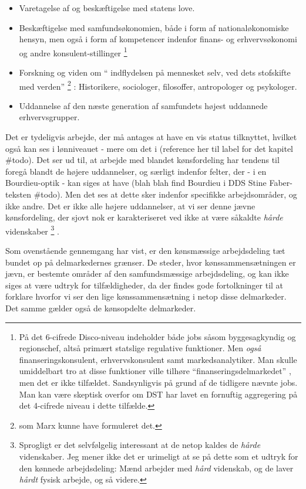 %
\begin{itemize}
 \itemsep -0.5em
   \item Varetagelse af og beskæftigelse med statens love.
   \item Beskæftigelse med samfundsøkonomien, både i form af nationaløkonomiske hensyn, men også i form af kompetencer indenfor finans- og erhvervsøkonomi og andre konsulent-stillinger%
   \footnote{ På det 6-cifrede Disco-niveau indeholder  både jobs såsom byggesagkyndig og regionschef, altså primært statslige regulative funktioner. Men \emph{også} finanseringskonsulent, erhvervskonsulent samt markedsanalytiker. Man skulle umiddelbart tro at disse funktioner ville tilhøre “finanseringsdelmarkedet” , men det er ikke tilfældet. Sandsynligvis på grund af de tidligere nævnte jobs. Man kan være skeptisk overfor om DST har lavet en fornuftig aggregering på det 4-cifrede niveau i dette tilfælde.}%
   \item Forskning og viden om “ indflydelsen på mennesket selv, ved dets stofskifte med verden”%
   \footnote{ som Marx kunne have formuleret det.}%
    : Historikere, sociologer, filosoffer, antropologer og psykologer.    
   \item Uddannelse af den næste generation af samfundets højest uddannede erhvervsgrupper. 
\end{itemize}
%

Det er tydeligvis arbejde, der må antages at have en vis status tilknyttet, hvilket også kan ses i lønniveauet - mere om det i (reference her til label for det kapitel \#todo).  Det ser ud til, at arbejde med blandet kønsfordeling har tendens til foregå blandt de højere uddannelser, og særligt indenfor felter, der - i en Bourdieu-optik - kan siges at have (blah blah find Bourdieu i DDS Stine Faber-teksten \#todo). Men det ses at dette sker indenfor specifikke arbejdsområder, og ikke andre. Det er ikke alle højere uddannelser, at vi ser denne jævne kønsfordeling, der sjovt nok er karakteriseret ved ikke at være såkaldte \emph{hårde} videnskaber%
%
\footnote{ Sprogligt er det selvfølgelig interessant at de netop kaldes de \emph{hårde} videnskaber. Jeg mener ikke det er urimeligt at se på dette som et udtryk for den kønnede arbejdsdeling: Mænd arbejder med \emph{hård} videnskab, og de laver \emph{hårdt} fysisk arbejde, og så videre.}%
%
 . 



Som ovenstående gennemgang har vist, er den kønsmæssige arbejdsdeling tæt bundet op på delmarkedernes grænser. De steder, hvor kønssammensætningen er jævn, er bestemte områder af den samfundsmæssige arbejdsdeling, og kan ikke siges at være udtryk for tilfældigheder, da der findes gode fortolkninger til at forklare hvorfor vi ser den lige kønssammensætning i netop disse delmarkeder. Det samme gælder også de kønsopdelte delmarkeder.

